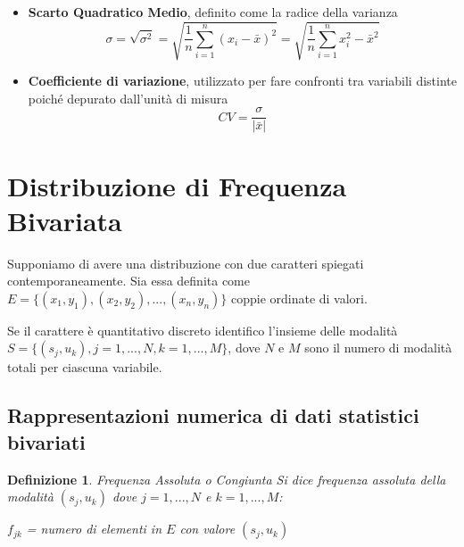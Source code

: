 \documentclass{article}
\newtheorem{definition}{Definizione}[section]
\newtheorem{teorema}{Teorema}[section]
\begin{document}
\begin{itemize}
\begin{itemize}
                        
                        
                 \begin{teorema}
                    La varianza della somma di due variabili risulta uguale alla somma delle varianze delle singole variabili solo se queste sono tra loro indipendenti.
                     \end{teorema}
                         
                    \item \textbf{Scarto Quadratico Medio}, definito come la radice della varianza
                            $$\sigma=\sqrt{\sigma^2}=\sqrt{\frac{1}{n}\sum_{i=1}^{n}(x_i-\bar{x})^2}=
                            \sqrt{\frac{1}{n}\sum_{i=1}^{n}x_i^2 - \bar{x}^2 }$$
                    \item \textbf{Coefficiente di variazione}, utilizzato per fare confronti tra variabili distinte poiché depurato dall'unità di misura $$CV=\frac{\sigma}{|\bar{x}|}$$
            \end{itemize}%
            
            
    \end{itemize}

\newpage

    \section{Distribuzione di Frequenza Bivariata}
    Supponiamo di avere una distribuzione con due caratteri spiegati contemporaneamente. Sia essa definita come $E=\{(x_1,y_1),(x_2,y_2),...,(x_n,y_n)\} $ coppie ordinate di valori. 
    
    Se il carattere è quantitativo discreto identifico l'insieme delle modalità $S=\{(s_j,u_k), j=1,...,N,k=1,...,M\}$, dove $N$ e $M$ sono il numero di modalità totali per ciascuna variabile. 
    
     \subsection{Rappresentazioni numerica di dati statistici bivariati}
     
     \begin{definition}{Frequenza Assoluta o Congiunta} 
    Si dice frequenza assoluta della modalità $(s_j,u_k)$ dove 
    $j = 1,...,N$ e $k=1,...,M$: 
    
    $f_{jk}$ = numero di elementi in $E$ con valore $(s_j,u_k)$
      \end{definition}
      
\end{document}
